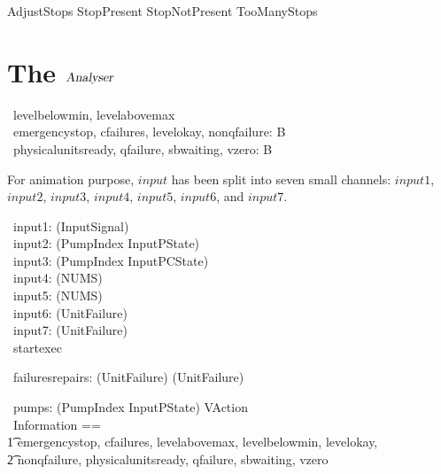 \documentclass{report} %
\renewcommand{\boolean}{{\mathbb B}}
\begin{document}
\begin{zed}
  AdjustStops  StopPresent \lor StopNotPresent \lor TooManyStops
\end{zed}

\section{The $\mathsl{Analyser}$}

\begin{circus}
  \circchannel\ levelbelowmin, levelabovemax \\
  \circchannel\ emergencystop, cfailures, levelokay, nonqfailure: \boolean \\
  \circchannel\ physicalunitsready, qfailure, sbwaiting, vzero: \boolean
\end{circus}

For animation purpose, $input$ has been split into seven small channels: $input1$, $input2$, $input3$, $input4$, $input5$, $input6$, and $input7$.
\begin{circus}


  \circchannel\ input1: (\power InputSignal) \\
  \circchannel\ input2: (PumpIndex \fun InputPState) \\ %
  \circchannel\ input3: (PumpIndex \fun InputPCState) \\ %
  \circchannel\ input4: (NUMS) \\ %
  \circchannel\ input5: (NUMS) \\ %
  \circchannel\ input6: (\power UnitFailure) \\ %
  \circchannel\ input7: (\power UnitFailure) \\ %

  \circchannel\ startexec \\
\end{circus}

\begin{circus}
   \circchannel\ failuresrepairs: (\power UnitFailure) \cross (\power UnitFailure)
\end{circus}

\begin{circus}
  \circchannel\ pumps: (PumpIndex \fun InputPState) \cross VAction \\
  \circchannelset\ Information ==  \\ \t1
    \lchanset emergencystop, cfailures, levelabovemax, levelbelowmin, levelokay, \\ \t2
              nonqfailure, physicalunitsready, qfailure, sbwaiting, vzero \rchanset
\end{circus}
\end{document}

